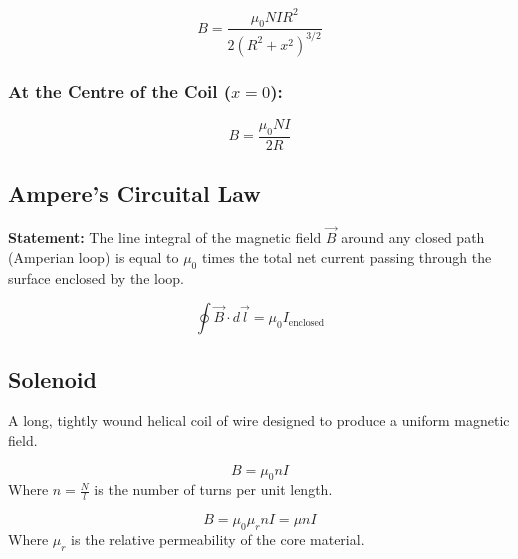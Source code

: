 \documentclass[11pt,a4paper]{article}
\begin{document}
\begin{formulabox}
    \[ B = \frac{\mu_0 N I R^2}{2(R^2 + x^2)^{3/2}} \]
\end{formulabox}

\subsubsection{At the Centre of the Coil ($x = 0$):}
\begin{formulabox}
    \[ B = \frac{\mu_0 N I}{2R} \]
\end{formulabox}

\subsection{Ampere's Circuital Law}
\begin{pyqbox}
    \textbf{Statement:} The line integral of the magnetic field $\vec{B}$ around any closed path (Amperian loop) is equal to $\mu_0$ times the total net current passing through the surface enclosed by the loop.
\end{pyqbox}

\begin{formulabox}
    \[ \oint \vec{B} \cdot d\vec{l} = \mu_0 I_{\text{enclosed}} \]
\end{formulabox}

\subsection{Solenoid}
\begin{pyqbox}
    A long, tightly wound helical coil of wire designed to produce a uniform magnetic field.
\end{pyqbox}

\begin{formulabox}
    \[ B = \mu_0 n I \]
    Where $n = \frac{N}{l}$ is the number of turns per unit length.
\end{formulabox}

\begin{formulabox}
    \[ B = \mu_0 \mu_r n I = \mu n I \]
    Where $\mu_r$ is the relative permeability of the core material.
\end{formulabox}
\end{document}
